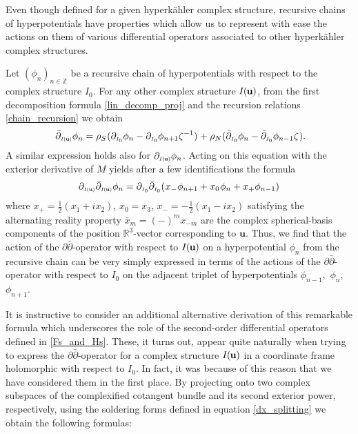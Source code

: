 \documentclass[11pt]{amsart}
\theoremstyle{remark}
\theoremstyle{remark}
\theoremstyle{definition}
\theoremstyle{definition}
\theoremstyle{definition}
\newcommand{\IU}{I\nhp(\nhp\mathbf{u}\hspace{-0.2pt})} %
\newcommand{\Iu}{\scriptscriptstyle{I\nhp(\nhp\mathbf{u}\hspace{-0.25pt})}} %
\newcommand{\Io}{{\scriptscriptstyle I_0}}
\newcommand{\0}{{\scriptstyle 0'}} %
\newcommand{\1}{{\scriptstyle 1'}}
\newcommand{\hp}{\hspace{0.5pt}} %
\newcommand{\nhp}{\hspace{-0.5pt}} %
\begin{document}
Even though defined for a given hyperk\"ahler complex structure, recursive chains of hyperpotentials have properties which allow us to represent with ease the actions on them of various differential operators associated to other hyperk\"ahler complex structures. 

Let $(\phi_n)_{n \in \mathbb{Z}}$ be a recursive chain of hyperpotentials with respect to the complex structure $I_0$. For any other complex structure $\IU$, from the first decomposition formula \eqref{lin_decomp_proj} and the recursion relations \eqref{chain_recursion} we obtain  
\begin{equation} \label{dbar_Iu_phi_n}
\bar{\partial}_{\Iu} \phi_n = \rho_S \hp (\partial_{\Io}\phi_n - \partial_{\Io}\phi_{n+1} \zeta^{-1}) \hp + \rho_N (\bar{\partial}_{\Io}\phi_n - \bar{\partial}_{\Io}\phi_{n-1}\zeta \hp) \rlap{.}
\end{equation}
A similar expression holds also for $\partial_{\Iu}\phi_n$. Acting on this equation with the exterior derivative of $M$ yields after a few identifications the formula 
\begin{equation} \label{ddbar-chain}
\partial_{\Iu} \bar{\partial}_{\Iu} \phi_n = \partial_{\Io}\bar{\partial}_{\Io} (\hp x_-\phi_{n+1} + x_0\hp \phi_n + x_+\phi_{n-1}) 
\end{equation}
where $x_+ = \frac{1}{2} (x_1 + i x_2)$, $x_0 = x_3$, $x_- = - \frac{1}{2} (x_1 - i x_2)$ satisfying the alternating reality property $\bar{x}_m = (-)^m x_{-m}$ are the complex spherical-basis components of the position \mbox{$\mathbb{R}^3$-vector} corresponding to $\mathbf{u}$. Thus, we find that the action of the $\partial\bar{\partial}$-operator with respect to $\IU$  on a hyperpotential $\phi_n$ from the recursive chain can be very simply expressed in terms of the actions of the $\partial\bar{\partial}$-operator with respect to $I_0$ on the adjacent triplet of hyperpotentials \mbox{$\phi_{n-1}$, $\phi_n$, $\phi_{n+1}$}.

It is instructive to consider an additional alternative derivation of this remarkable formula which underscores the role of the second-order differential operators defined in \eqref{Fs_and_Hs}. These, it turns out, appear quite naturally when trying to express the $\partial\bar{\partial}$-operator for a complex structure $\IU$ in a coordinate frame holomorphic with respect to $I_0$. In fact, it was because of this reason that we have considered them in the first place. By projecting onto two complex subspaces of the complexified cotangent bundle and its second exterior power, respectively, using the soldering forms defined in equation \eqref{dx_splitting} we obtain the following formulas: 
\end{document}
